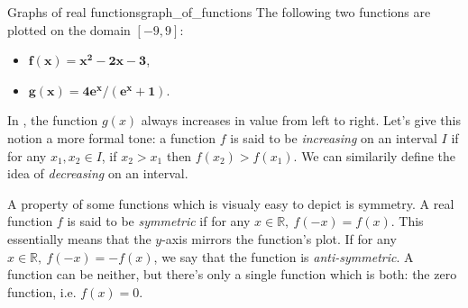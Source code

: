 \begin{example}{Graphs of real functions}{graph_of_functions}
	The following two functions are plotted on the domain $\left[ -9,9 \right]$:

	\begin{minipage}{0.35\textwidth}
		\begin{itemize}
			\item \textcolor{xred}{$\bm{f(x)=x^{2}-2x-3}$},
			\item \textcolor{xgreen}{$\bm{g(x)=4e^{x}/\left( e^{x}+1 \right)}$}.
		\end{itemize}
	\end{minipage}%
	\begin{minipage}[c]{0.65\textwidth}
		\centering
	\end{minipage}
\end{example}

In , the function $g(x)$ always increases in value from left to right. Let's give this notion a more formal tone: a function $f$ is said to be \emph{increasing} on an interval $I$ if for any $x_{1},x_{2}\in I$, if $x_{2}>x_{1}$ then $f\left( x_{2} \right) > f\left( x_{1} \right)$. We can similarily define the idea of \emph{decreasing} on an interval.

A property of some functions which is visualy easy to depict is symmetry. A real function $f$ is said to be \emph{symmetric} if for any $x\in\mathbb{R},\ f(-x)=f(x)$. This essentially means that the $y$-axis mirrors the function's plot. If for any $x\in\mathbb{R},\ f(-x)=-f(x)$, we say that the function is \emph{anti-symmetric}. A function can be neither, but there's only a single function which is both: the zero function, i.e. $f(x)=0$.

